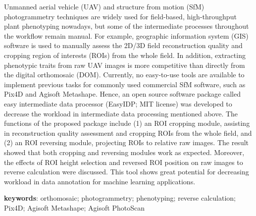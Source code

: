 \begin{center}
{\begin{minipage}{0.95\textwidth}
      Unmanned aerial vehicle (UAV) and structure from motion (SfM) photogrammetry techniques are widely used for field-based, high-throughput plant phenotyping nowadays, but some of the intermediate processes throughout the workflow remain manual. For example, geographic information system (GIS) software is used to manually assess the 2D/3D field reconstruction quality and cropping region of interests (ROIs) from the whole field. In addition, extracting phenotypic traits from raw UAV images is more competitive than directly from the digital orthomosaic (DOM). Currently, no easy-to-use tools are available to implement previous tasks for commonly used commercial SfM software, such as Pix4D and Agisoft Metashape. Hence, an open source software package called easy intermediate data processor (EasyIDP; MIT license) was developed to decrease the workload in intermediate data processing mentioned above. The functions of the proposed package include (1) an ROI cropping module, assisting in reconstruction quality assessment and cropping ROIs from the whole field, and (2) an ROI reversing module, projecting ROIs to relative raw images. The result showed that both cropping and reversing modules work as expected. Moreover, the effects of ROI height selection and reversed ROI position on raw images to reverse calculation were discussed. This tool shows great potential for decreasing workload in data annotation for machine learning applications.

      \vspace{5mm}
      \textbf{keywords}: orthomosaic; photogrammetry; phenotyping; reverse calculation; Pix4D; Agisoft Metashape; Agisoft PhotoScan

    \end{minipage}
  }
\end{center}